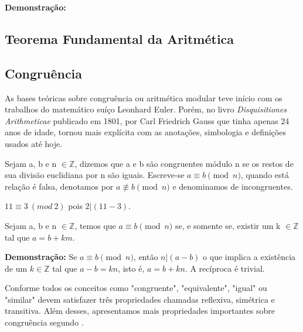 \noindent \textbf{Demonstração:}
		
		
		\subsection{Teorema Fundamental da Aritmética}
		

  		\subsection{Congruência}

As bases teóricas sobre congruência ou aritmética modular teve início com os trabalhos do matemático suíço Leonhard Euler. Porém, no livro \textit{Disquisitiones Arithmeticae} publicado em 1801, por Carl Friedrich Gauss que tinha apenas 24 anos de idade, tornou mais explícita com as anotações, simbologia e definições usados até hoje.

\begin{cdefinicao}
	Sejam a, b e n $\in \mathbb{Z}$, dizemos que a e b são congruentes módulo n se os restos de sua divisão euclidiana por n são iguais. Escreve-se $a \equiv b \pmod{n}$, quando está relação é falsa, denotamos por $a \not\equiv b \pmod{n}$ e denominamos de incongruentes.
\end{cdefinicao}

\begin{exem}
	$11 \equiv 3 \ (mod \ 2)$ pois $2|(11-3)$.
\end{exem}

\begin{prop}	
	Sejam a, b e n $\in \mathbb{Z}$, temos que $a \equiv b \pmod{n}$ se, e somente se, existir um k $\in \mathbb{Z}$ tal que $a = b + km$.
\end{prop}

\noindent \textbf{Demonstração:} Se $a \equiv b \pmod{n}$, então $n|(a - b)$ o que implica a existência de um $k \in \mathbb{Z}$ tal que $a - b = kn$, isto é, $a = b + kn$. A recíproca é trivial.

Conforme  todos os conceitos como "congruente", "equivalente", "igual" ou "similar"  devem satisfazer três propriedades chamadas reflexiva, simétrica e transitiva. Além desses, apresentamos mais propriedades importantes sobre congruência segundo .

